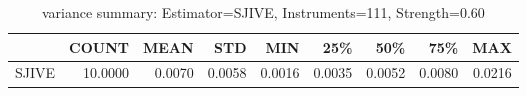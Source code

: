 \begin{table}[ht]
\centering
\caption{variance summary: Estimator=SJIVE, Instruments=111, Strength=0.60}
\begin{tabular}{lrrrrrrrr}
\toprule
 & COUNT & MEAN & STD & MIN & 25\% & 50\% & 75\% & MAX \\
\midrule
SJIVE & 10.0000 & 0.0070 & 0.0058 & 0.0016 & 0.0035 & 0.0052 & 0.0080 & 0.0216 \\
\bottomrule
\end{tabular}
\end{table}

